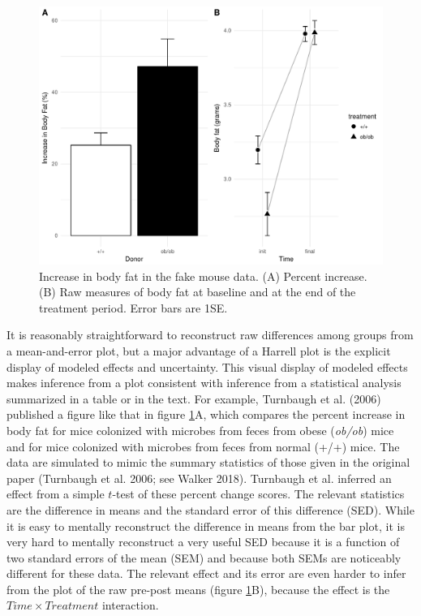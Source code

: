 \documentclass[]{article}
\theoremstyle{definition}
\theoremstyle{definition}
\theoremstyle{definition}
\theoremstyle{remark}
\begin{document}
\begin{figure}
\includegraphics{../output/mouseBarPlot} \caption{Increase in body fat in the fake mouse data. (A) Percent increase. (B) Raw measures of body fat at baseline and at the end of the treatment period. Error bars are 1SE.}\label{fig:mouseBarPlot}
\end{figure}

It is reasonably straightforward to reconstruct raw differences among
groups from a mean-and-error plot, but a major advantage of a Harrell
plot is the explicit display of modeled effects and uncertainty. This
visual display of modeled effects makes inference from a plot consistent
with inference from a statistical analysis summarized in a table or in
the text. For example, Turnbaugh et al. (2006) published a figure like
that in figure \ref{fig:mouseBarPlot}A, which compares the percent
increase in body fat for mice colonized with microbes from feces from
obese (\emph{ob/ob}) mice and for mice colonized with microbes from
feces from normal (+/+) mice. The data are simulated to mimic the
summary statistics of those given in the original paper (Turnbaugh et
al. 2006; see Walker 2018). Turnbaugh et al. inferred an effect from a
simple \(t\)-test of these percent change scores. The relevant
statistics are the difference in means and the standard error of this
difference (SED). While it is easy to mentally reconstruct the
difference in means from the bar plot, it is very hard to mentally
reconstruct a very useful SED because it is a function of two standard
errors of the mean (SEM) and because both SEMs are noticeably different
for these data. The relevant effect and its error are even harder to
infer from the plot of the raw pre-post means (figure
\ref{fig:mouseBarPlot}B), because the effect is the
\(Time \times Treatment\) interaction.
\end{document}
